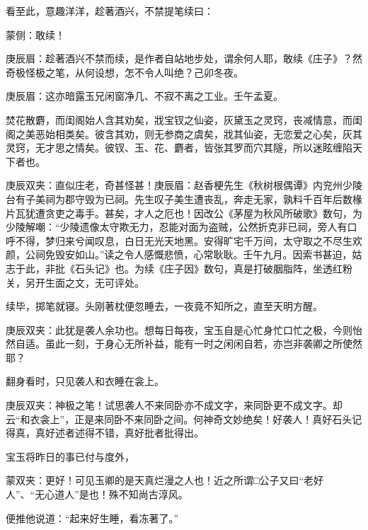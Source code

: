 \begin{parag}
    看至此，意趣洋洋，趁著酒兴，不禁提笔续曰：\begin{note}蒙侧：敢续！\end{note}\begin{note}庚辰眉：趁著酒兴不禁而续，是作者自站地步处，谓余何人耶，敢续《庄子》？然奇极怪极之笔，从何设想，怎不令人叫绝？己卯冬夜。\end{note}\begin{note}庚辰眉：这亦暗露玉兄闲窗净几、不寂不离之工业。壬午孟夏。\end{note}
\end{parag}


\begin{qute2sp}

    焚花散麝，而闺阁始人含其劝矣，戕宝钗之仙姿，灰黛玉之灵窍，丧减情意，而闺阁之美恶始相类矣。彼含其劝，则无参商之虞矣，戕其仙姿，无恋爱之心矣，灰其灵窍，无才思之情矣。彼钗、玉、花、麝者，皆张其罗而穴其隧，所以迷眩缠陷天下者也。\begin{note}庚辰双夹：直似庄老，奇甚怪甚！庚辰眉：赵香梗先生《秋树根偶谭》内兖州少陵台有子美祠为郡守毁为已祠。先生叹子美生遭丧乱，奔走无家，孰料千百年后数椽片瓦犹遭贪吏之毒手。甚矣，才人之厄也！因改公《茅屋为秋风所破歌》数句，为少陵解嘲：“少陵遗像太守欺无力，忍能对面为盗贼，公然折克非已祠，旁人有口呼不得，梦归来兮闻叹息，白日无光天地黑。安得旷宅千万间，太守取之不尽生欢颜，公祠免毁安如山。”读之令人感慨悲愤，心常耿耿。壬午九月。因索书甚迫，姑志于此，非批《石头记》也。为续《庄子因》数句，真是打破胭脂阵，坐透红粉关，另开生面之文，无可评处。\end{note}
\end{qute2sp}


\begin{parag}
    续毕，掷笔就寝。头刚著枕便忽睡去，一夜竟不知所之，直至天明方醒。\begin{note}庚辰双夹：此犹是袭人余功也。想每日每夜，宝玉自是心忙身忙口忙之极，今则怡然自适。虽此一刻，于身心无所补益，能有一时之闲闲自若，亦岂非袭卿之所使然耶？\end{note}翻身看时，只见袭人和衣睡在衾上。\begin{note}庚辰双夹：神极之笔！试思袭人不来同卧亦不成文字，来同卧更不成文字。却云“和衣衾上”，正是来同卧不来同卧之间。何神奇文妙绝矣！好袭人！真好石头记得真，真好述者述得不错，真好批者批得出。\end{note}宝玉将昨日的事已付与度外，\begin{note}蒙双夹：更好！可见玉卿的是天真烂漫之人也！近之所谓□公子又曰“老好人”、“无心道人”是也！殊不知尚古淳风。\end{note}便推他说道：“起来好生睡，看冻著了。”
\end{parag}


